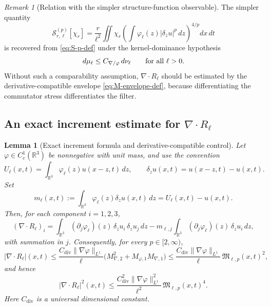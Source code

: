 \documentclass[11pt]{article}
\numberwithin{equation}{section}
\theoremstyle{plain}
\newtheorem{lemma}[theorem]{Lemma}
\theoremstyle{definition}
\theoremstyle{remark}
\newtheorem{remark}[theorem]{Remark}
\newcommand{\R}{\mathbb R}
\begin{document}
\begin{remark}[Relation with the simpler structure-function observable]\label{rem:simple-structure-function}
The simpler quantity
\[
\mathcal S_{r,\ell}^{(p)}[\chi_r]
=
\frac r{\ell^2}\iint\chi_r
\left(\int\varphi_\ell(z)|\delta_z u|^p\,dz\right)^{4/p}dx\,dt
\]
is recovered from \eqref{eq:S-p-def} under the kernel-dominance hypothesis
\[
 d\mu_\ell\le C_{\nabla/\varphi}\,d\nu_\ell
 \qquad\hbox{for all }\ell>0.
\]
Without such a comparability assumption, $\nabla\!\cdot R_\ell$ should be estimated by the derivative-compatible envelope \eqref{eq:M-envelope-def}, because differentiating the commutator stress differentiates the filter.
\end{remark}

\subsection{An exact increment estimate for \texorpdfstring{$\nabla\!\cdot R_\ell$}{div Rl}}

\begin{lemma}[Exact increment formula and derivative-compatible control]\label{lem:increment-divR}
Let $\varphi\in C_c^1(\R^3)$ be nonnegative with unit mass, and use the convention
\[
U_\ell(x,t)=\int_{\R^3}\varphi_\ell(z)u(x-z,t)\,dz,
\qquad
\delta_z u(x,t)=u(x-z,t)-u(x,t).
\]
Set
\[
m_\ell(x,t):=\int_{\R^3}\varphi_\ell(z)\delta_z u(x,t)\,dz=U_\ell(x,t)-u(x,t).
\]
Then, for each component $i=1,2,3$,
\begin{equation}\label{eq:divR-increment-identity}
(\nabla\!\cdot R_\ell)_i
=
\int_{\R^3}(\partial_j\varphi_\ell)(z)\,\delta_z u_i\,\delta_z u_j\,dz
-
 m_{\ell,j}\int_{\R^3}(\partial_j\varphi_\ell)(z)\,\delta_z u_i\,dz,
\end{equation}
with summation in $j$.  Consequently, for every $p\in[2,\infty)$,
\begin{equation}\label{eq:pointwise-divR-compatible}
|\nabla\!\cdot R_\ell|(x,t)
\le
\frac{C_{\mathrm{div}}\|\nabla\varphi\|_{L^1}}{\ell}
\bigl(M_{\nabla,2}^2+M_{\varphi,1}M_{\nabla,1}\bigr)
\le
\frac{C_{\mathrm{div}}\|\nabla\varphi\|_{L^1}}{\ell}\,\mathfrak M_{\ell,p}(x,t)^2,
\end{equation}
and hence
\begin{equation}\label{eq:pointwise-divR-p}
|\nabla\!\cdot R_\ell|^2(x,t)
\le
\frac{C_{\mathrm{div}}^2\|\nabla\varphi\|_{L^1}^2}{\ell^2}\,
\mathfrak M_{\ell,p}(x,t)^4.
\end{equation}
Here $C_{\mathrm{div}}$ is a universal dimensional constant.
\end{lemma}
\end{document}
